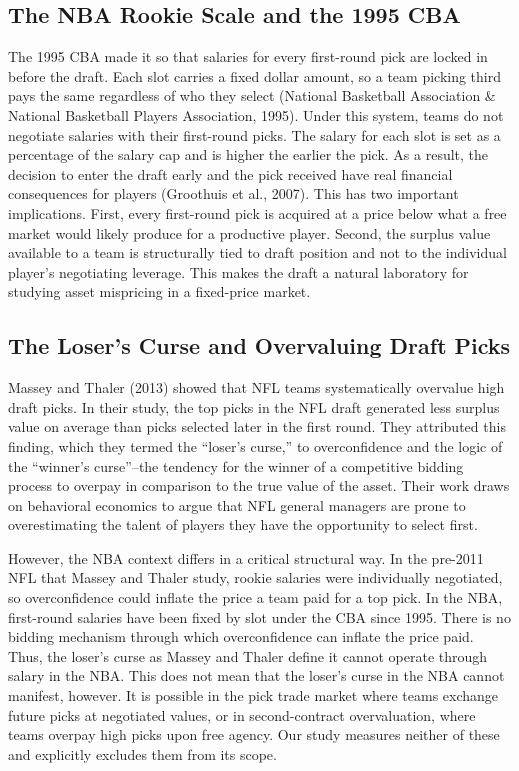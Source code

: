 \documentclass[12pt,letterpaper]{article}
\begin{document}
\subsection{The NBA Rookie Scale and the 1995 CBA}

The 1995 CBA made it so that salaries for every first-round pick are locked in before the draft. Each slot carries a fixed dollar amount, so a team picking third pays the same regardless of who they select (National Basketball Association \& National Basketball Players Association, 1995). Under this system, teams do not negotiate salaries with their first-round picks. The salary for each slot is set as a percentage of the salary cap and is higher the earlier the pick. As a result, the decision to enter the draft early and the pick received have real financial consequences for players (Groothuis et al., 2007). This has two important implications. First, every first-round pick is acquired at a price below what a free market would likely produce for a productive player. Second, the surplus value available to a team is structurally tied to draft position and not to the individual player's negotiating leverage. This makes the draft a natural laboratory for studying asset mispricing in a fixed-price market.

\subsection{The Loser's Curse and Overvaluing Draft Picks}

Massey and Thaler (2013) showed that NFL teams systematically overvalue high draft picks. In their study, the top picks in the NFL draft generated less surplus value on average than picks selected later in the first round. They attributed this finding, which they termed the ``loser's curse,'' to overconfidence and the logic of the ``winner's curse''--the tendency for the winner of a competitive bidding process to overpay in comparison to the true value of the asset. Their work draws on behavioral economics to argue that NFL general managers are prone to overestimating the talent of players they have the opportunity to select first.

However, the NBA context differs in a critical structural way. In the pre-2011 NFL that Massey and Thaler study, rookie salaries were individually negotiated, so overconfidence could inflate the price a team paid for a top pick. In the NBA, first-round salaries have been fixed by slot under the CBA since 1995. There is no bidding mechanism through which overconfidence can inflate the price paid. Thus, the loser's curse as Massey and Thaler define it cannot operate through salary in the NBA. This does not mean that the loser's curse in the NBA cannot manifest, however. It is possible in the pick trade market where teams exchange future picks at negotiated values, or in second-contract overvaluation, where teams overpay high picks upon free agency. Our study measures neither of these and explicitly excludes them from its scope.
\end{document}
